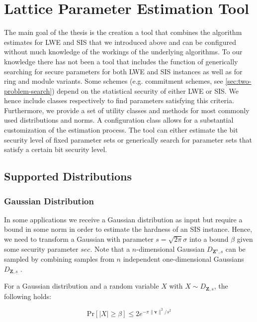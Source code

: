 \documentclass[
  a4paper,  %
  twoside,  %
  bibliography=totoc,
  headsepline,
  cleardoublepage=empty,
  parskip=half,
  draft=false
]{scrbook}
\begin{document}
\chapter{Lattice Parameter Estimation Tool}
The main goal of the thesis is the creation a tool that combines the algorithm estimates for LWE and SIS that we introduced above and can be configured without much knowledge of the workings of the underlying algorithms. To our knowledge there has not been a tool that includes the function of generically searching for secure parameters for both LWE and SIS instances as well as for ring and module variants. Some schemes (e.g. commitment schemes, see \cref{sec:two-problem-search}) depend on the statistical security of either LWE or SIS. We hence include classes respectively to find parameters satisfying this criteria. %
Furthermore, we provide a set of utility classes and methods for most commonly used distributions and norms.
A configuration class allows for a substantial customization of the estimation process.
The tool can either estimate the bit security level of fixed parameter sets or generically search for parameter sets that satisfy a certain bit security level.

\section{Supported Distributions} \label{sec:supported-distributions}%
\subsection{Gaussian Distribution}
In some applications we receive a Gaussian distribution as input but require a bound in some norm in order to estimate the hardness of an SIS instance. Hence, we need to transform a Gaussian with parameter $s  = \sqrt{2 \pi} \sigma$ into a bound $\beta$ given some security parameter $sec$. Note that a $n$-dimensional Gaussian $D_{\mathbf{Z}^n, s}$ can be sampled by combining samples from $n$ independent one-dimensional Gaussians $D_{\mathbf{Z}, s}$ \cite{GJS15}. %

For a Gaussian distribution and a random variable $X$ with $X \sim D_{\mathbf{Z}, s}$, the following holds: %

\begin{equation}
  \text{Pr}\left[ |X| \geq \beta \right] \leq 2 e^{-\pi \|\mathbf{v}\|^2/s^2}
\end{equation}
\end{document}
